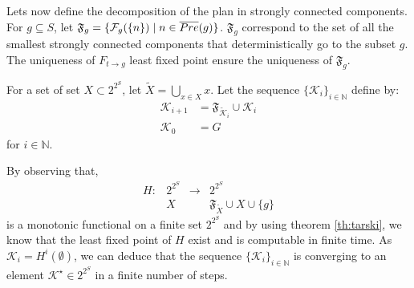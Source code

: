 Lets now define the decomposition of the plan in strongly connected components.
For $g \subseteq S$, let $\mathfrak{F}_g = \{ \mathcal{F}_g(\{n\}) \mid n \in \overline{Pre} (g) \}$.
$\mathfrak{F}_g$ correspond to the set of all the smallest strongly connected components that deterministically go to the subset $g$.
The uniqueness of  $F_{t \rightarrow g}$ least fixed point ensure the uniqueness of $\mathfrak{F}_g$.

For a set of set $X \subset 2^{2^S}$, let $\tilde{X} = \bigcup_{x \in X} x$.
Let the sequence $\{\mathcal{K}_i\}_{i \in \mathbb{N}}$ define by:
\begin{equation*}
\begin{split}
\mathcal{K}_{i+1} &= \mathfrak{F}_{\tilde{\mathcal{K}}_i} \cup \mathcal{K}_i\\
\mathcal{K}_0 &= G
\end{split}
\end{equation*}
for $i \in \mathbb{N}$. 

By observing that,
\begin{equation}
\begin{array}{llll}
H : &2^{2^S} &\rightarrow &2^{2^S}\\
&X & & \mathfrak{F}_{\tilde{X}} \cup X \cup \{ g \}
\end{array}
\end{equation}
is a monotonic functional on a finite set $2^{2^S}$ and by using theorem \ref{th:tarski}, we know that the least fixed point of $H$ exist and is computable in finite time.
As $\mathcal{K}_i = H^i(\emptyset)$, we can deduce that the sequence $\{\mathcal{K}_i\}_{i \in \mathbb{N}}$ is converging to an element $\mathcal{K}^\star \in 2^{2^S}$ in a finite number of steps.

